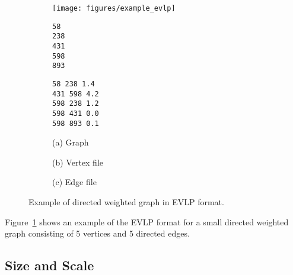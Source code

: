 \begin{figure}[t!]
\centering
\begin{subfigure}{0.3\textwidth}
\texttt{[image: figures/example\_evlp]}
\end{subfigure}
\begin{subfigure}{0.3\textwidth}
\begin{Verbatim}[frame=single]
58 
238
431
598
893
\end{Verbatim}
\end{subfigure}
\begin{subfigure}{0.3\textwidth}
\begin{Verbatim}[frame=single]
58 238 1.4
431 598 4.2
598 238 1.2
598 431 0.0
598 893 0.1
\end{Verbatim}
\end{subfigure}
\newline
\newline
\begin{subfigure}{0.3\textwidth}
  \centering
  (a) Graph
\end{subfigure}
\begin{subfigure}{0.3\textwidth}
  \centering
  (b) Vertex file
\end{subfigure}
\begin{subfigure}{0.3\textwidth}
  \centering
  (c) Edge file
\end{subfigure}

\caption{Example of directed weighted graph in EVLP format.}
\label{fig:definition_example_evlp}
\end{figure}

Figure~\ref{fig:definition_example_evlp} shows an example of the EVLP format for a small directed weighted graph consisting of 5 vertices and 5 directed edges.


\subsection{Size and Scale}
\label{sec:definition_scale}

